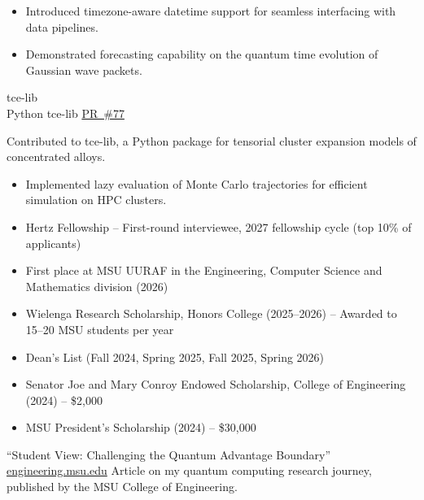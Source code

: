 \documentclass[9pt]{developercv} %
\let\oldhref\href
\newcommand{\linkul}[1]{\setbox0\hbox{#1}\rlap{\textcolor{black!35}{\rule[-1.6pt]{\wd0}{0.3pt}}}\box0}
\renewcommand{\href}[2]{\oldhref{#1}{\linkul{#2}}}
\begin{document}
\begin{entrylist}
{\begin{itemize}[noitemsep,topsep=0pt,parsep=0pt,partopsep=0pt, leftmargin=7pt]
	\item Introduced timezone-aware datetime support for seamless interfacing with data pipelines.
	\item Demonstrated forecasting capability on the quantum time evolution of Gaussian wave packets. 
	\end{itemize}
	}
\entry
	{tce-lib \\ Python}
	{tce-lib}
	{\href{https://github.com/MUEXLY/tce-lib/pull/77}{PR \#77}}
	{Contributed to tce-lib, a Python package for tensorial cluster expansion models of concentrated alloys.
	\begin{itemize}[noitemsep,topsep=0pt,parsep=0pt,partopsep=0pt, leftmargin=7pt]
	\item Implemented lazy evaluation of Monte Carlo trajectories for efficient simulation on HPC clusters.
	\end{itemize}
		}
\end{entrylist}
\vspace*{-7pt}
\vspace{-10pt}
\begin{itemize}
	\item Hertz Fellowship -- First-round interviewee, 2027 fellowship cycle (top 10\% of applicants)
	\item First place at MSU UURAF in the Engineering, Computer Science and Mathematics division (2026)
	\item Wielenga Research Scholarship, Honors College (2025--2026) -- Awarded to 15--20 MSU students per year
	\item Dean's List (Fall 2024, Spring 2025, Fall 2025, Spring 2026)
	\item Senator Joe and Mary Conroy Endowed Scholarship, College of Engineering (2024) -- \$2,000
	\item MSU President's Scholarship (2024) -- \$30,000
\end{itemize}
	\begin{entrylist}
			{``Student View: Challenging the Quantum Advantage Boundary''}
			{\href{https://engineering.msu.edu/news/student-view-challenging-quantum-advantage-boundary}{engineering.msu.edu}}
			{Article on my quantum computing research journey, published by the MSU College of Engineering.}
	\end{entrylist}
\end{document}

